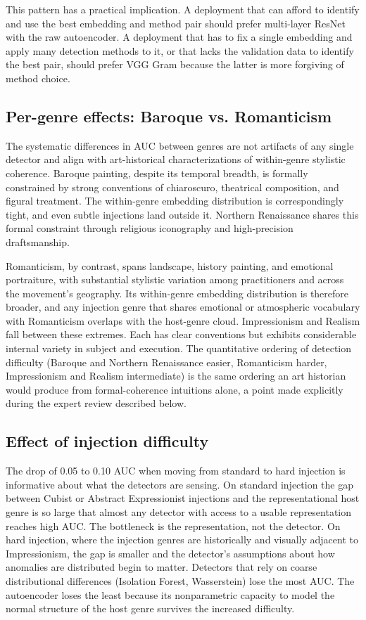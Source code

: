 \documentclass[conference]{IEEEtran}
\begin{document}
This pattern has a practical implication. A deployment that can afford to identify and use the best embedding and method pair should prefer multi-layer ResNet with the raw autoencoder. A deployment that has to fix a single embedding and apply many detection methods to it, or that lacks the validation data to identify the best pair, should prefer VGG Gram because the latter is more forgiving of method choice.

\subsection{Per-genre effects: Baroque vs. Romanticism}

The systematic differences in AUC between genres are not artifacts of any single detector and align with art-historical characterizations of within-genre stylistic coherence. Baroque painting, despite its temporal breadth, is formally constrained by strong conventions of chiaroscuro, theatrical composition, and figural treatment. The within-genre embedding distribution is correspondingly tight, and even subtle injections land outside it. Northern Renaissance shares this formal constraint through religious iconography and high-precision draftsmanship.

Romanticism, by contrast, spans landscape, history painting, and emotional portraiture, with substantial stylistic variation among practitioners and across the movement's geography. Its within-genre embedding distribution is therefore broader, and any injection genre that shares emotional or atmospheric vocabulary with Romanticism overlaps with the host-genre cloud. Impressionism and Realism fall between these extremes. Each has clear conventions but exhibits considerable internal variety in subject and execution. The quantitative ordering of detection difficulty (Baroque and Northern Renaissance easier, Romanticism harder, Impressionism and Realism intermediate) is the same ordering an art historian would produce from formal-coherence intuitions alone, a point made explicitly during the expert review described below.

\subsection{Effect of injection difficulty}

The drop of 0.05 to 0.10 AUC when moving from standard to hard injection is informative about what the detectors are sensing. On standard injection the gap between Cubist or Abstract Expressionist injections and the representational host genre is so large that almost any detector with access to a usable representation reaches high AUC. The bottleneck is the representation, not the detector. On hard injection, where the injection genres are historically and visually adjacent to Impressionism, the gap is smaller and the detector's assumptions about how anomalies are distributed begin to matter. Detectors that rely on coarse distributional differences (Isolation Forest, Wasserstein) lose the most AUC. The autoencoder loses the least because its nonparametric capacity to model the normal structure of the host genre survives the increased difficulty.
\end{document}
